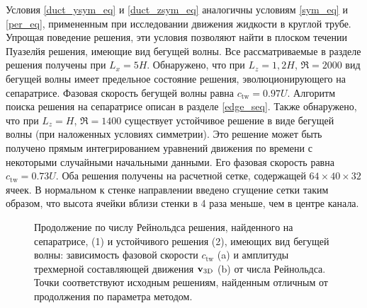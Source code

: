 Условия \eqref{duct_ysym_eq} и \eqref{duct_zsym_eq} аналогичны условиям \eqref{sym_eq} и \eqref{per_eq}, примененным при исследовании движения жидкости в круглой трубе. Упрощая поведение решения, эти условия позволяют найти в плоском течении Пуазелйя решения, имеющие вид бегущей волны. Все рассматриваемые в разделе решения получены при $L_x = 5H$. Обнаружено, что при $L_z = 1{,}2H$, $\Re = 2000$ вид бегущей волны имеет предельное состояние решения, эволюционирующего на сепаратрисе. Фазовая скорость бегущей волны равна $c_\mathrm{tw}=0.97U$. Алгоритм поиска решения на сепаратрисе описан в разделе \ref{edge_seq}. Также обнаружено, что при $L_z = H$, $\Re = 1400$ существует устойчивое решение в виде бегущей волны (при наложенных условиях симметрии). Это решение может быть получено прямым интегрированием уравнений движения по времени с некоторыми случайными начальными данными. Его фазовая скорость равна $c_\mathrm{tw} = 0.73U$. Оба решения получены на расчетной сетке, содержащей $64 \times 40 \times 32$ ячеек. В нормальном к стенке направлении введено сгущение сетки таким образом, что высота ячейки вблизи стенки в 4 раза меньше, чем в центре канала. 

\begin{figure}
\caption{Продолжение по числу Рейнольдса решения, найденного на сепаратрисе, (1) и устойчивого решения (2), имеющих вид бегущей волны: зависимость фазовой скорости $c_\mathrm{tw}$ (a) и амплитуды трехмерной составляющей движения $\mathbf{v}_\mathrm{3D}$ (b) от числа Рейнольдса. Точки соответствуют исходным решениям, найденным отличным от продолжения по параметра методом.}
\label{ductTW_contin_pic}
\end{figure}

